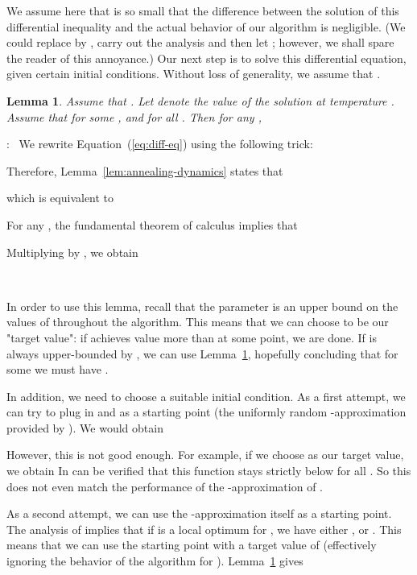 \documentclass{article}[11pt]
\newtheorem{lemma}[theorem]{Lemma}
\renewenvironment{proof}{\noindent{\bf Proof}:~}{\\}
\begin{document}
We assume here that  is so small that the difference
between the solution of this differential inequality and the actual
behavior of our algorithm is negligible. 
(We could replace  by , carry out the analysis
and then let ; however, we shall spare the reader of this annoyance.)
Our next step is to solve this differential equation, given certain initial conditions.
Without loss of generality, we assume that .

\begin{lemma}
\label{lem:diff-solution}
Assume that .
Let  denote the value of the solution at temperature .
Assume that  for some , and 
for all . Then for any ,
 
\end{lemma}

\begin{proof}
We rewrite Equation~(\ref{eq:diff-eq}) using the following trick:

Therefore, Lemma~\ref{lem:annealing-dynamics} states that

which is equivalent to

For any , the fundamental theorem of calculus implies that

Multiplying by , we obtain

\end{proof}

In order to use this lemma,
recall that the parameter  is an upper bound on the values of  throughout
the algorithm. This means that we can choose  to be our "target value":
if  achieves value more than  at some point, we are done.
If  is always upper-bounded by , we can use Lemma~\ref{lem:diff-solution},
hopefully concluding that for some  we must have .

In addition, we need to choose a suitable initial condition.
As a first attempt, we can try to plug in  and  as a starting point
(the uniformly random -approximation provided by \cite{FMV07}). We would obtain

However, this is not good enough. For example, if we choose  as our target value,
we obtain 
In can be verified that this function stays strictly below  for all .
So this does not even match the performance of the -approximation of \cite{FMV07}.

As a second attempt, we can use the -approximation itself as a starting point.
The analysis of \cite{FMV07} implies that if  is a local optimum for ,
we have either , or . This means that we can use
the starting point  with a target value of 
(effectively ignoring the behavior of the algorithm for ).
Lemma~\ref{lem:diff-solution} gives
\end{document}
